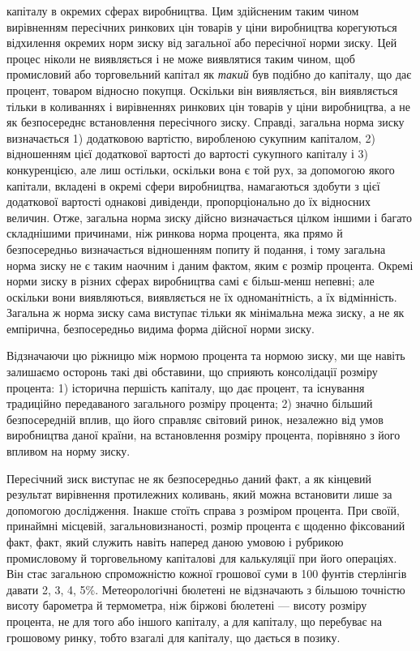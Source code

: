 \parcont{}  %
капіталу в окремих сферах виробництва. Цим здійсненим таким
чином вирівненням пересічних ринкових цін товарів у ціни виробництва
корегуються відхилення окремих норм зиску від загальної
або пересічної норми зиску. Цей процес ніколи не
виявляється і не може виявлятися таким чином, щоб промисловий
або торговельний капітал як \emph{такий} був подібно до капіталу,
що дає процент, товаром відносно покупця. Оскільки він
виявляється, він виявляється тільки в коливаннях і вирівненнях
ринкових цін товарів у ціни виробництва, а не як безпосереднє
встановлення пересічного зиску. Справді, загальна норма зиску
визначається 1) додатковою вартістю, виробленою сукупним
капіталом, 2) відношенням цієї додаткової вартості до вартості
сукупного капіталу і 3) конкуренцією, але лиш остільки,
оскільки вона є той рух, за допомогою якого капітали, вкладені
в окремі сфери виробництва, намагаються здобути з цієї
додаткової вартості однакові дивіденди, пропорціонально до їх
відносних величин. Отже, загальна норма зиску дійсно визначається
цілком іншими і багато складнішими причинами, ніж ринкова
норма процента, яка прямо й безпосередньо визначається
відношенням попиту й подання, і тому загальна норма зиску
не є таким наочним і даним фактом, яким є розмір процента.
Окремі норми зиску в різних сферах виробництва самі є більш-менш
непевні; але оскільки вони виявляються, виявляється не
їх одноманітність, а їх відмінність. Загальна ж норма зиску сама
виступає тільки як мінімальна межа зиску, а не як емпірична,
безпосередньо видима форма дійсної норми зиску.

Відзначаючи цю ріжницю між нормою процента та нормою
зиску, ми ще навіть залишаємо осторонь такі дві обставини, що
сприяють консолідації розміру процента: 1) історична першість
капіталу, що дає процент, та існування традиційно передаваного
загального розміру процента; 2) значно більший безпосередній
вплив, що його справляє світовий ринок, незалежно від умов
виробництва даної країни, на встановлення розміру процента, порівняно
з його впливом на норму зиску.

Пересічний зиск виступає не як безпосередньо даний факт,
а як кінцевий результат вирівнення протилежних коливань, який
можна встановити лише за допомогою дослідження. Інакше
стоїть справа з розміром процента. При своїй, принаймні місцевій,
загальновизнаності, розмір процента є щоденно фіксований
факт, факт, який служить навіть наперед даною умовою і рубрикою
промисловому й торговельному капіталові для калькуляції
при його операціях. Він стає загальною спроможністю
кожної грошової суми в 100 фунтів стерлінгів давати 2, 3, 4,
5\%. Метеорологічні бюлетені не відзначають з більшою точністю
висоту барометра й термометра, ніж біржові бюлетені —
висоту розміру процента, не для того або іншого капіталу, а для
капіталу, що перебуває на грошовому ринку, тобто взагалі для
капіталу, що дається в позику.
